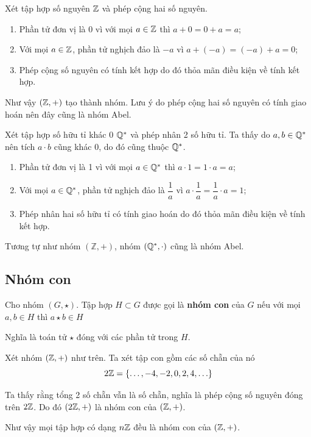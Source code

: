 \begin{example}
    Xét tập hợp số nguyên $\mathbb{Z}$ và phép cộng hai số nguyên.
    \begin{enumerate}[noitemsep]
        \item Phần tử đơn vị là 0 vì với mọi $a \in \mathbb{Z}$ thì $a + 0 = 0 + a = a$;
        \item Với mọi $a \in \mathbb{Z}$, phần tử nghịch đảo là $-a$ vì $a + (-a) = (-a) + a = 0$;
        \item Phép cộng số nguyên có tính kết hợp do đó thỏa mãn điều kiện về tính kết hợp.
    \end{enumerate}
    Như vậy $(\mathbb{Z}, +)$ tạo thành nhóm. Lưu ý do phép cộng hai số nguyên có tính giao hoán nên đây cũng là nhóm Abel.
\end{example}

\begin{example}
    Xét tập hợp số hữu tỉ khác 0 $\mathbb{Q}^*$ và phép nhân 2 số hữu tỉ. Ta thấy do $a, b \in \mathbb{Q}^*$ nên tích $a \cdot b$ cũng khác 0, do đó cũng thuộc $\mathbb{Q}^*$.
    \begin{enumerate}
        \item Phần tử đơn vị là 1 vì với mọi $a \in \mathbb{Q}^*$ thì $a \cdot 1 = 1 \cdot a = a$;
        \item Với mọi $a \in \mathbb{Q}^*$, phần tử nghịch đảo là $\dfrac{1}{a}$ vì $a \cdot \dfrac{1}{a} = \dfrac{1}{a} \cdot a = 1$;
        \item Phép nhân hai số hữu tỉ có tính giao hoán do đó thỏa mãn điều kiện về tính kết hợp.
    \end{enumerate}
    Tương tự như nhóm $(\mathbb{Z, +})$, nhóm $(\mathbb{Q}^*, \cdot)$ cũng là nhóm Abel.
\end{example}

\subsection*{Nhóm con}

\begin{definition}
    Cho nhóm $(G, \star)$. Tập hợp $H \subset G$ được gọi là \textbf{nhóm con} của $G$ nếu với mọi $a, b \in H$ thì $a \star b \in H$
\end{definition}
 
Nghĩa là toán tử $\star$ đóng với các phần tử trong $H$.

\begin{example}
    Xét nhóm $(\mathbb{Z}, +)$ như trên. Ta xét tập con gồm các số chẵn của nó
    \[2\mathbb{Z} = \{\ldots, -4, -2, 0, 2, 4, \ldots\}\]

    Ta thấy rằng tổng 2 số chẵn vẫn là số chẵn, nghĩa là phép cộng số nguyên đóng trên $2\mathbb{Z}$.
    Do đó $(2\mathbb{Z}, +)$ là nhóm con của $(\mathbb{Z}, +)$.

    Như vậy mọi tập hợp có dạng $n \mathbb{Z}$ đều là nhóm con của $(\mathbb{Z}, +)$.
\end{example}

